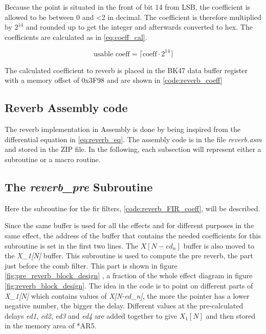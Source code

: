 Because the point is situated in the front of bit 14 from LSB, the coefficient is allowed to be between 0 and <2 in decimal. The coefficient is therefore multiplied by $2^{14}$ and rounded up to get the integer and afterwards converted to hex. The coefficients are calculated as in \autoref{eq:coeff_cal}.

    \begin{equation}\label{eq:coeff_cal}
\text{usable coeff} = \lceil\text{coeff} \cdot 2^{14}\rceil
    \end{equation}

The calculated coefficient to \gls{reverb} is placed in the BK47 data buffer register with a memory offset of 0x3F98 and are shown in \autoref{code:reverb_coeff}



\subsection{Reverb Assembly code}
The reverb implementation in Assembly is done by being inspired from the differential equation in \autoref{eq:reverb_eq}. The assembly code is in the file \textit{reverb.asm} and stored in the ZIP file. In the following, each subsection will represent either a subroutine or a macro routine. 

\subsection{The \textit{reverb_pre} Subroutine}
Here the subroutine for the \gls{fir} filters, \autoref{code:reverb_FIR_coeff}, will be described.


Since the same buffer is used for all the effects and for different purposes in the same effect, the address of the buffer that contains the needed coefficients for this subroutine is set in the first two lines. The $X[N-ed_{n}]$ buffer is also moved to the \textit{X_1[N]} buffer. This subroutine is used to compute the pre \gls{reverb}, the part just before the comb filter. This part is shown in figure \autoref{fig:pre_reverb_block_design} , a fraction of the whole effect diagram in figure \autoref{fig:reverb_block_design}. The idea in the code is to point on different parts of \textit{X_1[N]}  which contains values of \textit{X[N-ed_n]}, the more the pointer has a lower negative number, the bigger the delay. Different values at the pre-calculated delays \textit{ed1}, \textit{ed2}, \textit{ed3} and \textit{ed4} are added together to give $X_{1}[N]$ and then stored in the memory area of  *AR5. \\

